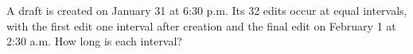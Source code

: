 A draft is created on January 31 at 6:30 p.m. Its 32 edits occur at equal intervals, with the first edit one interval after creation and the final edit on February 1 at 2:30 a.m. How long is each interval?
